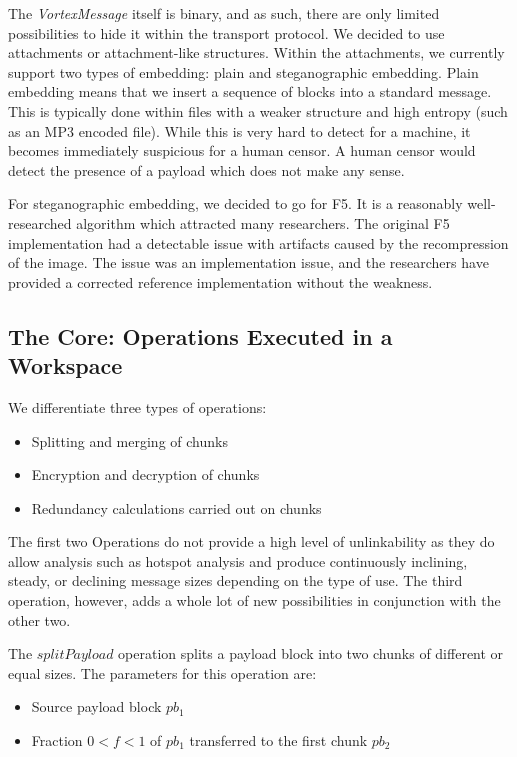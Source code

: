 \documentclass[acmsmall, screen]{acmart}
\begin{document}
The \emph{VortexMessage} itself is binary, and as such, there are only limited possibilities to hide it within the transport protocol. We decided to use attachments or attachment-like structures. Within the attachments, we currently support two types of embedding: plain and steganographic embedding. Plain embedding means that we insert a sequence of blocks into a standard message. This is typically done within files with a weaker structure and high entropy (such as an MP3 encoded file). While this is very hard to detect for a machine, it becomes immediately suspicious for a human censor. A human censor would detect the presence of a payload which does not make any sense.

For steganographic embedding, we decided to go for F5\cite{f5}. It is a reasonably well-researched algorithm which attracted many researchers. The original F5 implementation had a detectable issue with artifacts\cite{F5broken} caused by the recompression of the image. The issue was an implementation issue, and the researchers have provided a corrected reference implementation without the weakness. %

\subsection{The Core: Operations Executed in a Workspace}
We differentiate three types of operations:
\begin{itemize}
	\item Splitting and merging of chunks
	\item Encryption and decryption of chunks
	\item Redundancy calculations carried out on chunks
\end{itemize}

The first two Operations do not provide a high level of unlinkability as they do allow analysis such as hotspot analysis and produce continuously inclining, steady, or declining message sizes depending on the type of use. The third operation, however, adds a whole lot of new possibilities in conjunction with the other two.

The $splitPayload$ operation splits a payload block into two chunks of different or equal sizes. The parameters for this operation are:
\begin{itemize}
	\item Source payload block $pb_1$
	\item Fraction $0<f<1$ of $pb_1$ transferred to the first chunk $pb_2$
\end{itemize}
\end{document}
